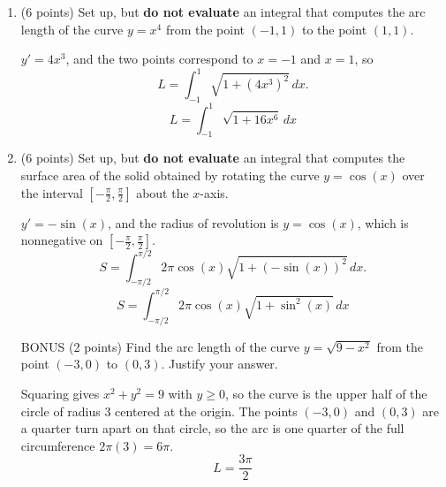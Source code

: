 \documentclass[12pt]{article}
\newcommand{\ds}{\displaystyle}
\begin{document}
\begin{enumerate}
  \newpage

\item (6 points) Set up, but {\bf do not evaluate} an integral that computes
  the arc length of the curve $y=x^4$ from the point $(-1,1)$ to the point $(1,1)$.

\begin{solution}
$y'=4x^3$, and the two points correspond to $x=-1$ and $x=1$, so
\[
L=\int_{-1}^{1}\sqrt{1+\left(4x^3\right)^2}\,dx .
\]
\[
\boxed{\ L=\int_{-1}^{1}\sqrt{1+16x^6}\,dx\ }
\]
\end{solution}

\item (6 points) Set up, but {\bf do not evaluate} an integral that computes
  the surface area of the solid obtained by rotating the curve
  $y=\cos(x)$ over the interval $\left[ -\frac{\pi}{2},\frac{\pi}{2}
  \right]$ about the $x$-axis.

\begin{solution}
$y'=-\sin(x)$, and the radius of revolution is $y=\cos(x)$, which is nonnegative on $\left[-\frac{\pi}{2},\frac{\pi}{2}\right]$.
\[
S=\int_{-\pi/2}^{\pi/2} 2\pi\cos(x)\sqrt{1+\left(-\sin(x)\right)^2}\,dx .
\]
\[
\boxed{\ S=\int_{-\pi/2}^{\pi/2} 2\pi\cos(x)\sqrt{1+\sin^2(x)}\,dx\ }
\]
\end{solution}

  BONUS (2 points) Find the arc length of the curve $\ds y = \sqrt{9 -
    x^2}$ from the point $(-3,0)$ to $(0,3)$. Justify your answer.

\begin{solution}
Squaring gives $x^2+y^2=9$ with $y\ge 0$, so the curve is the upper half of the circle of radius $3$ centered at the origin.  The points $(-3,0)$ and $(0,3)$ are a quarter turn apart on that circle, so the arc is one quarter of the full circumference $2\pi(3)=6\pi$.
\[
\boxed{\ L=\frac{3\pi}{2}\ }
\]
\end{solution}


\end{enumerate}
\end{document}
